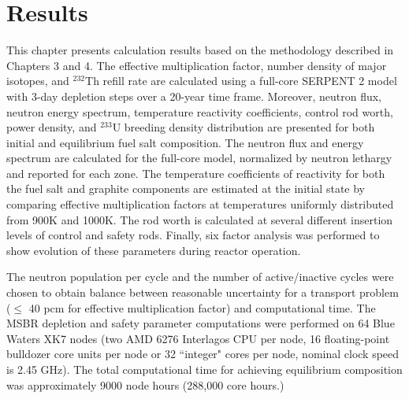\chapter[Results]{Results}

This chapter presents calculation results based on the methodology described in Chapters 3 and 4. The effective multiplication factor, number density of major isotopes, and $^{232}$Th refill rate are calculated using a full-core SERPENT 2 model with 3-day depletion steps over a 20-year time frame. Moreover, neutron flux, neutron energy spectrum, temperature reactivity coefficients, control rod worth, power density, and $^{233}$U breeding density distribution are presented for both initial and equilibrium fuel salt composition. The neutron flux and energy spectrum are calculated for the full-core model, normalized by neutron lethargy and reported for each zone. The temperature coefficients of reactivity for both the fuel salt and graphite components are estimated at the initial state by comparing effective multiplication factors at temperatures uniformly distributed from 900K and 1000K. The rod worth is calculated at several different insertion levels of control and safety rods. Finally, six factor analysis was performed to show evolution of these parameters during reactor operation.

The neutron population per cycle and the number of active/inactive cycles were chosen to obtain balance between reasonable uncertainty for a transport problem ($\leq$ 40 pcm for effective multiplication factor) and computational time. The \gls{MSBR} depletion and safety parameter computations were performed on 64 Blue Waters XK7 nodes (two AMD 6276 Interlagos CPU per node, 16 floating-point bulldozer core units per node or 32 ``integer" cores per node, nominal clock speed is 2.45 GHz). The total computational time for achieving equilibrium composition was approximately 9000 node hours (288,000 core hours.)

